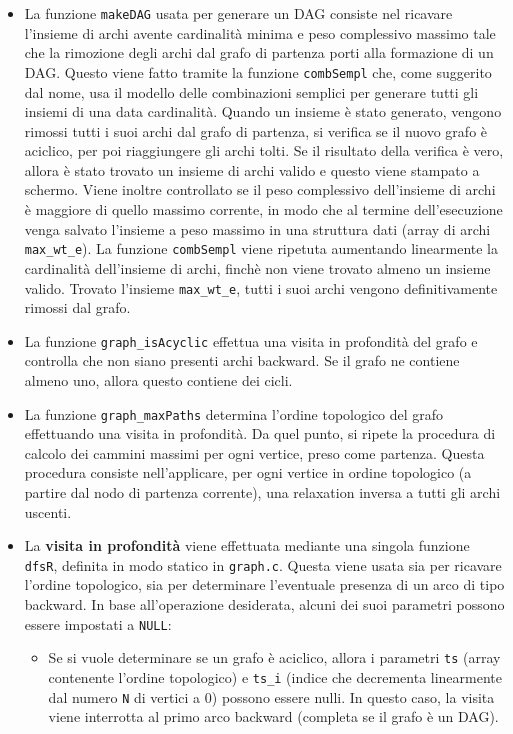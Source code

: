 \documentclass[a4paper]{article}
\newcommand{\code}[1]{\texttt{#1}}
\begin{document}
    \begin{itemize}
        \item La funzione \code{makeDAG} usata per generare un DAG consiste nel ricavare l'insieme di archi avente cardinalità minima e peso complessivo massimo tale che la rimozione degli archi dal grafo di partenza porti alla formazione di un DAG. Questo viene fatto tramite la funzione \code{combSempl} che, come suggerito dal nome, usa il modello delle combinazioni semplici per generare tutti gli insiemi di una data cardinalità. Quando un insieme è stato generato, vengono rimossi tutti i suoi archi dal grafo di partenza, si verifica se il nuovo grafo è aciclico, per poi riaggiungere gli archi tolti. Se il risultato della verifica è vero, allora è stato trovato un insieme di archi valido e questo viene stampato a schermo. Viene inoltre controllato se il peso complessivo dell'insieme di archi è maggiore di quello massimo corrente, in modo che al termine dell'esecuzione venga salvato l'insieme a peso massimo in una struttura dati (array di archi \code{max\_wt\_e}). La funzione \code{combSempl} viene ripetuta aumentando linearmente la cardinalità dell'insieme di archi, finchè non viene trovato almeno un insieme valido. Trovato l'insieme \code{max\_wt\_e}, tutti i suoi archi vengono definitivamente rimossi dal grafo.
        \item La funzione \code{graph\_isAcyclic} effettua una visita in profondità del grafo e controlla che non siano presenti archi backward. Se il grafo ne contiene almeno uno, allora questo contiene dei cicli.
        \item La funzione \code{graph\_maxPaths} determina l'ordine topologico del grafo effettuando una visita in profondità. Da quel punto, si ripete la procedura di calcolo dei cammini massimi per ogni vertice, preso come partenza. Questa procedura consiste nell'applicare, per ogni vertice in ordine topologico (a partire dal nodo di partenza corrente), una relaxation inversa a tutti gli archi uscenti. 
        \item La \textbf{visita in profondità} viene effettuata mediante una singola funzione \code{dfsR}, definita in modo statico in \code{graph.c}. Questa viene usata sia per ricavare l'ordine topologico, sia per determinare l'eventuale presenza di un arco di tipo backward. In base all'operazione desiderata, alcuni dei suoi parametri possono essere impostati a \code{NULL}:
            \begin{itemize}
                \item Se si vuole determinare se un grafo è aciclico, allora i parametri \code{ts} (array contenente l'ordine topologico) e \code{ts\_i} (indice che decrementa linearmente dal numero \code{N} di vertici a 0) possono essere nulli. In questo caso, la visita viene interrotta al primo arco backward (completa se il grafo è un DAG).

\end{itemize}
\end{itemize}
\end{document}
